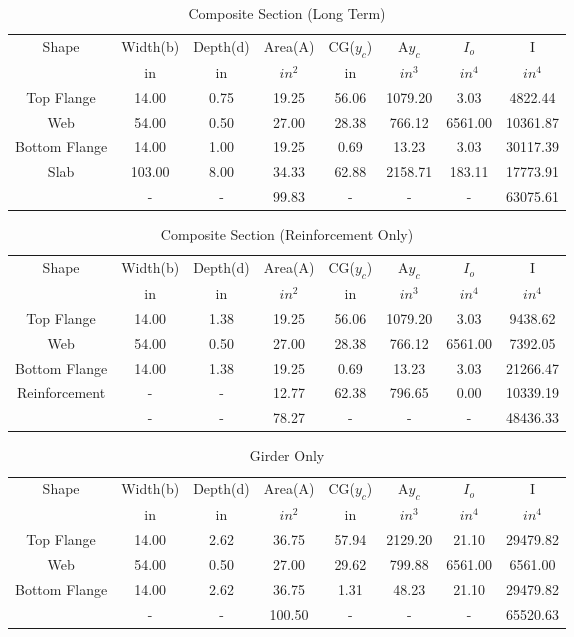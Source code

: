 \documentclass[11pt]{book}
\begin{document}
\begin{table}[H]
\centering
\caption{Composite Section (Long Term)}\begin{tabular}{|c|c|c|c|c|c|c|c|}
\hline
Shape &Width(b)     &Depth(d)  &Area(A)   &CG($y_c$)    &A$y_c$     &$I_o$    &I      \\
      &in           &in        &$in^2$    &in           &$in^3$     &$in^4$   &$in^4$  \\
\hline
Top Flange  &14.00 &0.75 &19.25 &56.06 &1079.20 &3.03 &4822.44\\ \hline
Web  &54.00 &0.50 &27.00 &28.38 &766.12 &6561.00 &10361.87\\ \hline
Bottom Flange  &14.00 &1.00 &19.25 &0.69 &13.23 &3.03 &30117.39\\ \hline
Slab &103.00 &8.00 &34.33 &62.88 &2158.71 &183.11 &17773.91\\ \hline
  &- &- &99.83 &- &- &- &63075.61\\ \hline
\end{tabular}
\end{table}
\begin{table}[H]
\centering
\caption{Composite Section (Reinforcement Only)}\begin{tabular}{|c|c|c|c|c|c|c|c|}
\hline
Shape &Width(b)     &Depth(d)  &Area(A)   &CG($y_c$)    &A$y_c$     &$I_o$    &I      \\
      &in           &in        &$in^2$    &in           &$in^3$     &$in^4$   &$in^4$  \\
\hline
Top Flange  &14.00 &1.38 &19.25 &56.06 &1079.20 &3.03 &9438.62\\ \hline
Web  &54.00 &0.50 &27.00 &28.38 &766.12 &6561.00 &7392.05\\ \hline
Bottom Flange  &14.00 &1.38 &19.25 &0.69 &13.23 &3.03 &21266.47\\ \hline
Reinforcement &- &- &12.77 &62.38 &796.65 &0.00 &10339.19\\ \hline
  &- &- &78.27 &- &- &- &48436.33\\ \hline
\end{tabular}
\end{table}
\begin{table}[H]
\centering
\caption{Girder Only}\begin{tabular}{|c|c|c|c|c|c|c|c|}
\hline
Shape &Width(b)     &Depth(d)  &Area(A)   &CG($y_c$)    &A$y_c$     &$I_o$    &I      \\
      &in           &in        &$in^2$    &in           &$in^3$     &$in^4$   &$in^4$  \\
\hline
Top Flange  &14.00 &2.62 &36.75 &57.94 &2129.20 &21.10 &29479.82\\ \hline
Web  &54.00 &0.50 &27.00 &29.62 &799.88 &6561.00 &6561.00\\ \hline
Bottom Flange  &14.00 &2.62 &36.75 &1.31 &48.23 &21.10 &29479.82\\ \hline
  &- &- &100.50 &- &- &- &65520.63\\ \hline
\end{tabular}
\end{table}
\end{document}
